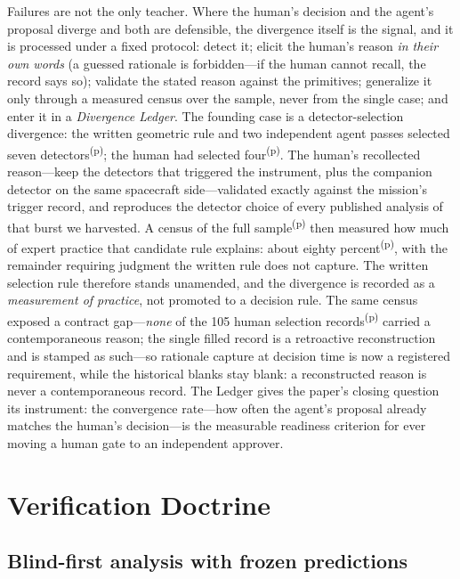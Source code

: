 \documentclass[twocolumn]{aastex631}
\newcommand{\prov}{\textsuperscript{(p)}}   %
\begin{document}
Failures are not the only teacher. Where the human's decision and the
agent's proposal diverge and both are defensible, the divergence itself is
the signal, and it is processed under a fixed protocol: detect it; elicit
the human's reason \emph{in their own words} (a guessed rationale is
forbidden---if the human cannot recall, the record says so); validate the
stated reason against the primitives; generalize it only through a
measured census over the sample, never from the single case; and enter it
in a \emph{Divergence Ledger}. The founding case is a detector-selection
divergence: the written geometric rule and two independent agent passes
selected seven detectors\prov; the human had selected four\prov. The human's
recollected reason---keep the detectors that triggered the instrument,
plus the companion detector on the same spacecraft side---validated
exactly against the mission's trigger record, and reproduces the detector
choice of every published analysis of that burst we harvested. A census
of the full sample\prov{} then measured how much of expert practice that
candidate rule explains: about eighty percent\prov, with the remainder
requiring judgment the written rule does not capture. The written
selection rule therefore stands unamended, and the divergence is recorded
as a \emph{measurement of practice}, not promoted to a decision rule. The
same census exposed a contract gap---\emph{none} of the 105 human selection
records\prov{} carried a contemporaneous reason; the single filled record
is a retroactive reconstruction and is stamped as such---so rationale
capture at decision time is now a registered requirement, while the
historical blanks stay blank: a reconstructed reason is never a
contemporaneous record. The Ledger gives the paper's closing question its instrument: the
convergence rate---how often the agent's proposal already matches the
human's decision---is the measurable readiness criterion for ever moving
a human gate to an independent approver.

\section{Verification Doctrine} \label{sec:verify}
\subsection{Blind-first analysis with frozen predictions}
\end{document}
